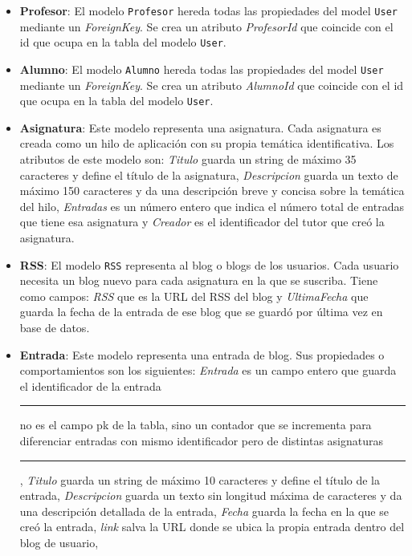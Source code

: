 \documentclass[a4paper, 12pt]{book}
\begin{document}
\begin{itemize}
  \texttt{User} contendr\'a todos los usuarios de aplicaci\'on previamente registrados, y ninguno de \'estos podr\'a coincidir con otro en nombre de usuario
  puesto que en la p\'agina de registro se aplica un filtro al introducir el dato \textit{Username}.
  \item {\bfseries Profesor}: El modelo \texttt{Profesor} hereda todas las propiedades del model \texttt{User} mediante un \textit{ForeignKey}. Se crea un
  atributo \textit{ProfesorId} que coincide con el id que ocupa en la tabla del modelo \texttt{User}.
  \item {\bfseries Alumno}: El modelo \texttt{Alumno} hereda todas las propiedades del model \texttt{User} mediante un \textit{ForeignKey}. Se crea un
  atributo \textit{AlumnoId} que coincide con el id que ocupa en la tabla del modelo \texttt{User}.
  \item {\bfseries Asignatura}: Este modelo representa una asignatura. Cada asignatura es creada como un hilo de aplicaci\'on con su propia tem\'atica
  identificativa. Los atributos de este modelo son: \textit{Titulo} guarda un string de m\'aximo 35 caracteres y define el t\'itulo de la asignatura, 
  \textit{Descripcion} guarda un texto de m\'aximo 150 caracteres y da una descripci\'on breve y concisa sobre la tem\'atica del hilo, \textit{Entradas} 
  es un n\'umero entero que indica el n\'umero total de entradas que tiene esa asignatura y \textit{Creador} es el identificador del tutor que cre\'o la
  asignatura.
  \item {\bfseries RSS}: El modelo \texttt{RSS} representa al blog o blogs de los usuarios. Cada usuario necesita un blog nuevo para cada asignatura en la
  que se suscriba. Tiene como campos: \textit{RSS} que es la URL del RSS del blog y \textit{UltimaFecha} que guarda la fecha de la entrada de ese blog 
  que se guard\'o por \'ultima vez en base de datos.
  \item {\bfseries Entrada}: Este modelo representa una entrada de blog. Sus propiedades o comportamientos son los siguientes: \textit{Entrada} es un campo 
  entero que guarda el identificador de la entrada \rule[1mm]{4mm}{0.1mm}no es el campo pk de la tabla, sino un contador que se incrementa para diferenciar
  entradas con mismo identificador pero de distintas asignaturas\rule[1mm]{4mm}{0.1mm}, \textit{Titulo} guarda un string de m\'aximo 10 caracteres y define 
  el t\'itulo de la entrada, \textit{Descripcion} guarda un texto sin longitud m\'axima de caracteres y da una descripci\'on detallada de la entrada,
  \textit{Fecha} guarda la fecha en la que se cre\'o la entrada, \textit{link} salva la URL donde se ubica la propia entrada dentro del blog de usuario, 

\end{itemize}
\end{document}
